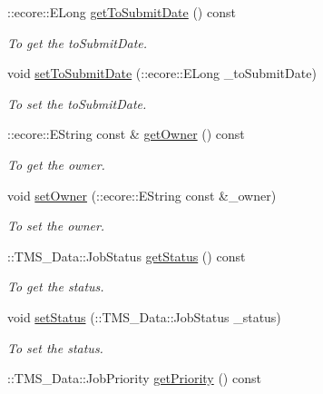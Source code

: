 \begin{DoxyCompactItemize}
::ecore::ELong \hyperlink{classTMS__Data_1_1ListJobsOptions_a3fe96dc5a4828094adc6b3f54a92501a}{getToSubmitDate} () const 
\begin{DoxyCompactList}\small\item\em To get the toSubmitDate. \item\end{DoxyCompactList}\item 
void \hyperlink{classTMS__Data_1_1ListJobsOptions_aa80fb9c8dc4d5e38e1aab0a10e94f8cf}{setToSubmitDate} (::ecore::ELong \_\-toSubmitDate)
\begin{DoxyCompactList}\small\item\em To set the toSubmitDate. \item\end{DoxyCompactList}\item 
::ecore::EString const \& \hyperlink{classTMS__Data_1_1ListJobsOptions_a88495fe4f222f0c91ab276e0b1a9626e}{getOwner} () const 
\begin{DoxyCompactList}\small\item\em To get the owner. \item\end{DoxyCompactList}\item 
void \hyperlink{classTMS__Data_1_1ListJobsOptions_a6d792fd3e0cc4ff45dd6912f29925858}{setOwner} (::ecore::EString const \&\_\-owner)
\begin{DoxyCompactList}\small\item\em To set the owner. \item\end{DoxyCompactList}\item 
::TMS\_\-Data::JobStatus \hyperlink{classTMS__Data_1_1ListJobsOptions_a3c2d90b6d78d601da74d2995d1392d7c}{getStatus} () const 
\begin{DoxyCompactList}\small\item\em To get the status. \item\end{DoxyCompactList}\item 
void \hyperlink{classTMS__Data_1_1ListJobsOptions_a804f65857e079282ce10aea6bedb6145}{setStatus} (::TMS\_\-Data::JobStatus \_\-status)
\begin{DoxyCompactList}\small\item\em To set the status. \item\end{DoxyCompactList}\item 
::TMS\_\-Data::JobPriority \hyperlink{classTMS__Data_1_1ListJobsOptions_a5b937c542d471d6f85f2af0c8963835d}{getPriority} () const 

\end{DoxyCompactItemize}
